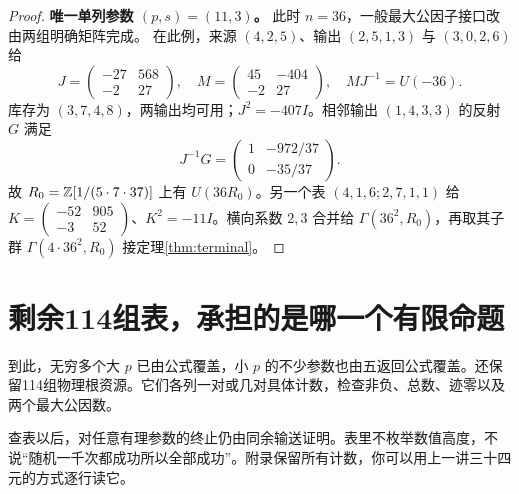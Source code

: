 \begin{proof}
\par\noindent\textbf{唯一单列参数 $(p,s)=(11,3)$。}
此时 $n=36$，一般最大公因子接口改由两组明确矩阵完成。
在此例，来源 $(4,2,5)$、输出 $(2,5,1,3)$ 与 $(3,0,2,6)$ 给
\[
J=\begin{pmatrix}-27&568\\-2&27\end{pmatrix},\quad
M=\begin{pmatrix}45&-404\\-2&27\end{pmatrix},\quad MJ^{-1}=U(-36).
\]
库存为 $(3,7,4,8)$，两输出均可用；$J^2=-407I$。相邻输出 $(1,4,3,3)$ 的反射 $G$ 满足
\[J^{-1}G=\begin{pmatrix}1&-972/37\\0&-35/37\end{pmatrix}.
\]
故 $R_0=\mathbb Z[1/(5\cdot7\cdot37)]$ 上有 $U(36R_0)$。另一个表 $(4,1,6;2,7,1,1)$ 给 $K=\left(\begin{smallmatrix}-52&905\\-3&52\end{smallmatrix}\right)$、$K^2=-11I$。横向系数 $2,3$ 合并给 $\Gamma(36^2,R_0)$，再取其子群 $\Gamma(4\cdot36^2,R_0)$ 接定理\ref{thm:terminal}。
\end{proof}

\section{剩余114组表，承担的是哪一个有限命题}
到此，无穷多个大 $p$ 已由公式覆盖，小 $p$ 的不少参数也由五返回公式覆盖。还保留114组物理根资源。它们各列一对或几对具体计数，检查非负、总数、迹零以及两个最大公因数。

查表以后，对任意有理参数的终止仍由同余输送证明。表里不枚举数值高度，不说“随机一千次都成功所以全部成功”。附录保留所有计数，你可以用上一讲三十四元的方式逐行读它。
